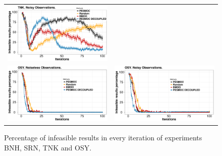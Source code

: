 \begin{figure}[htb]
\begin{tabular}{cc}
                \includegraphics[width=0.475\linewidth]{../Figures/pesmoc/benchmark/TNK_zeros_noisy} \\
                \includegraphics[width=0.475\linewidth]{../Figures/pesmoc/benchmark/OSY_zeros_noiseless} &
                \includegraphics[width=0.475\linewidth]{../Figures/pesmoc/benchmark/OSY_zeros_noisy} \\
        \end{tabular}
        \caption{Percentage of infeasible results in every iteration of experiments BNH, SRN, TNK and OSY.}
        \label{fig:benchmark_results_3}
\end{figure}


